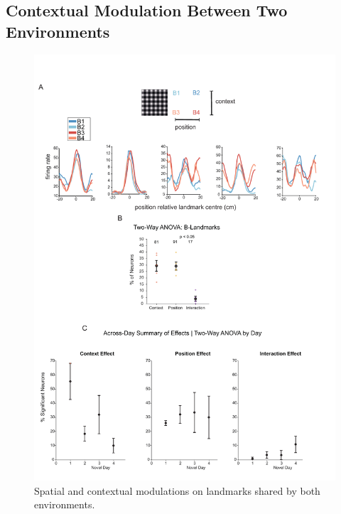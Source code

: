 \subsection{Contextual Modulation Between Two Environments}
\begin{figure}
    \centering
    \includegraphics[width=1\linewidth]{figures//Chapter 4 V1/fig4_spatial_modulation_tests.pdf}
    \caption{Spatial and contextual modulations on landmarks shared by both environments. }
    \label{fig:placeholder}
\end{figure}